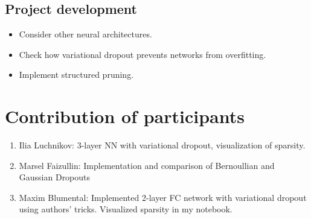 \documentclass{article}
\begin{document}
\subsection{Project development}

\begin{itemize}
    \item Consider other neural architectures.
    \item Check how variational dropout prevents networks from overfitting.
    \item Implement structured pruning.
\end{itemize}


\section{Contribution of participants}

\begin{enumerate}
    \item Ilia Luchnikov: 3-layer NN with variational dropout, visualization of sparsity.
    \item Marsel Faizullin: Implementation and comparison of Bernoullian and Gaussian Dropouts
    \item Maxim Blumental: Implemented 2-layer FC network with variational dropout using authors' tricks. Visualized sparsity in my notebook.
\end{enumerate}
\end{document}
